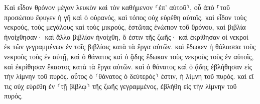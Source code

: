 \documentclass{openreader}
\begin{document}
Καὶ εἶδον θρόνον μέγαν λευκὸν καὶ τὸν καθήμενον ⸂ἐπ’ αὐτοῦ⸃, οὗ ἀπὸ ⸀τοῦ προσώπου ἔφυγεν ἡ γῆ καὶ ὁ οὐρανός, καὶ τόπος οὐχ εὑρέθη αὐτοῖς. 
καὶ εἶδον τοὺς νεκρούς, τοὺς μεγάλους καὶ τοὺς μικρούς, ἑστῶτας ἐνώπιον τοῦ θρόνου, καὶ βιβλία ἠνοίχθησαν· καὶ ἄλλο βιβλίον ἠνοίχθη, ὅ ἐστιν τῆς ζωῆς· καὶ ἐκρίθησαν οἱ νεκροὶ ἐκ τῶν γεγραμμένων ἐν τοῖς βιβλίοις κατὰ τὰ ἔργα αὐτῶν. 
καὶ ἔδωκεν ἡ θάλασσα τοὺς νεκροὺς τοὺς ἐν αὐτῇ, καὶ ὁ θάνατος καὶ ὁ ᾅδης ἔδωκαν τοὺς νεκροὺς τοὺς ἐν αὐτοῖς, καὶ ἐκρίθησαν ἕκαστος κατὰ τὰ ἔργα αὐτῶν. 
καὶ ὁ θάνατος καὶ ὁ ᾅδης ἐβλήθησαν εἰς τὴν λίμνην τοῦ πυρός. οὗτος ὁ ⸂θάνατος ὁ δεύτερός⸃ ἐστιν, ἡ λίμνη τοῦ πυρός. 
καὶ εἴ τις οὐχ εὑρέθη ἐν ⸂τῇ βίβλῳ⸃ τῆς ζωῆς γεγραμμένος, ἐβλήθη εἰς τὴν λίμνην τοῦ πυρός. 
\end{document}
